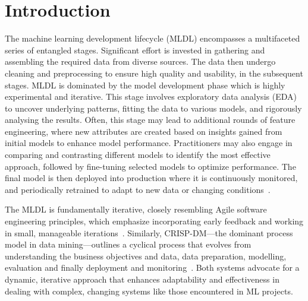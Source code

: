 
\section{Introduction}
The machine learning development lifecycle (MLDL) encompasses a multifaceted series of entangled stages. Significant effort is invested in gathering and assembling the required data from diverse sources. The data then undergo cleaning and preprocessing to ensure high quality and usability, in the subsequent stages. MLDL is dominated by the model development phase which is highly experimental and iterative. This stage involves exploratory data analysis (EDA) to uncover underlying patterns, fitting the data to various models, and rigorously analysing the results. Often, this stage may lead to additional rounds of feature engineering, where new attributes are created based on insights gained from initial models to enhance model performance. Practitioners may also engage in comparing and contrasting different models to identify the most effective approach, followed by fine-tuning selected models to optimize performance. The final model is then deployed into production where it is continuously monitored, and periodically retrained to adapt to new data or changing conditions~\cite{haakman2021ai,amershi2019software,sculley2015hidden}.

The MLDL is fundamentally iterative, closely resembling Agile software engineering principles, which emphasize incorporating early feedback and working in small, manageable iterations~\cite{betz2018managing}. Similarly, CRISP-DM---the dominant process model in data mining---outlines a cyclical process that evolves from understanding the business objectives and data, data preparation, modelling, evaluation and finally deployment and monitoring~\cite{martinez-plumed2021crisp-dm}. Both systems advocate for a dynamic, iterative approach that enhances adaptability and effectiveness in dealing with complex, changing systems like those encountered in ML projects.

